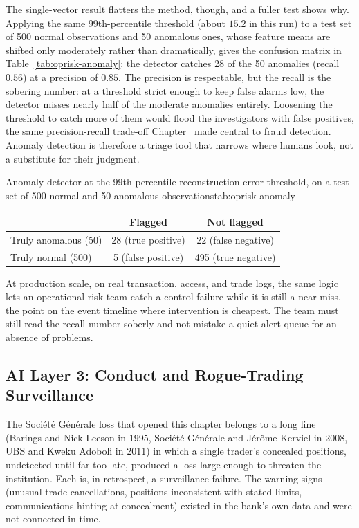 \documentclass[../ai_in_finance]{subfiles}
\begin{document}
The single-vector result flatters the method, though, and a fuller test shows why. Applying the same 99th-percentile threshold (about $15.2$ in this run) to a test set of 500 normal observations and 50 anomalous ones, whose feature means are shifted only moderately rather than dramatically, gives the confusion matrix in Table~\ref{tab:oprisk-anomaly}: the detector catches 28 of the 50 anomalies (recall $0.56$) at a precision of $0.85$. The precision is respectable, but the recall is the sobering number: at a threshold strict enough to keep false alarms low, the detector misses nearly half of the moderate anomalies entirely. Loosening the threshold to catch more of them would flood the investigators with false positives, the same precision-recall trade-off Chapter~ made central to fraud detection. Anomaly detection is therefore a triage tool that narrows where humans look, not a substitute for their judgment.

\begin{booktable}[htbp]{Anomaly detector at the 99th-percentile reconstruction-error threshold, on a test set of 500 normal and 50 anomalous observations}{tab:oprisk-anomaly}
\begin{tabular}{lcc}
\toprule
 & Flagged & Not flagged \\
\midrule
Truly anomalous (50) & 28 (true positive) & 22 (false negative) \\
Truly normal (500) & 5 (false positive) & 495 (true negative) \\
\bottomrule
\end{tabular}
\end{booktable}

At production scale, on real transaction, access, and trade logs, the same logic lets an operational-risk team catch a control failure while it is still a near-miss, the point on the event timeline where intervention is cheapest. The team must still read the recall number soberly and not mistake a quiet alert queue for an absence of problems.

\subsection{AI Layer 3: Conduct and Rogue-Trading Surveillance}
\label{sec:oprisk-surveillance}

The Société Générale loss that opened this chapter belongs to a long line (Barings and Nick Leeson in 1995, Société Générale and Jérôme Kerviel in 2008, UBS and Kweku Adoboli in 2011) in which a single trader's concealed positions, undetected until far too late, produced a loss large enough to threaten the institution. Each is, in retrospect, a surveillance failure. The warning signs (unusual trade cancellations, positions inconsistent with stated limits, communications hinting at concealment) existed in the bank's own data and were not connected in time.
\end{document}
